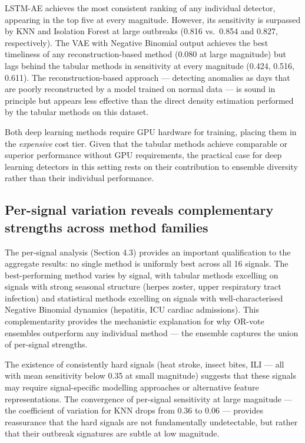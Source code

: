 \documentclass[11pt]{article}
\begin{document}
LSTM-AE achieves the most consistent ranking of any individual detector, appearing in the top five at every magnitude. However, its sensitivity is surpassed by KNN and Isolation Forest at large outbreaks (0.816 vs.\ 0.854 and 0.827, respectively). The VAE with Negative Binomial output achieves the best timeliness of any reconstruction-based method (0.080 at large magnitude) but lags behind the tabular methods in sensitivity at every magnitude (0.424, 0.516, 0.611). The reconstruction-based approach --- detecting anomalies as days that are poorly reconstructed by a model trained on normal data --- is sound in principle but appears less effective than the direct density estimation performed by the tabular methods on this dataset.

Both deep learning methods require GPU hardware for training, placing them in the \textit{expensive} cost tier. Given that the tabular methods achieve comparable or superior performance without GPU requirements, the practical case for deep learning detectors in this setting rests on their contribution to ensemble diversity rather than their individual performance.

\subsection{Per-signal variation reveals complementary strengths across method families}

The per-signal analysis (Section 4.3) provides an important qualification to the aggregate results: no single method is uniformly best across all 16 signals. The best-performing method varies by signal, with tabular methods excelling on signals with strong seasonal structure (herpes zoster, upper respiratory tract infection) and statistical methods excelling on signals with well-characterised Negative Binomial dynamics (hepatitis, ICU cardiac admissions). This complementarity provides the mechanistic explanation for why OR-vote ensembles outperform any individual method --- the ensemble captures the union of per-signal strengths.

The existence of consistently hard signals (heat stroke, insect bites, ILI --- all with mean sensitivity below 0.35 at small magnitude) suggests that these signals may require signal-specific modelling approaches or alternative feature representations. The convergence of per-signal sensitivity at large magnitude --- the coefficient of variation for KNN drops from 0.36 to 0.06 --- provides reassurance that the hard signals are not fundamentally undetectable, but rather that their outbreak signatures are subtle at low magnitude.
\end{document}
